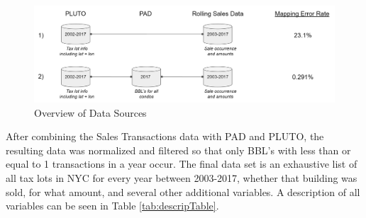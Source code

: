 \documentclass[12pt,]{article}
\begin{document}
\begin{figure}[H]
\includegraphics[width=1\linewidth]{Sections/tables and figures/Data Schema} \caption{Overview of Data Sources}\label{fig:Data Schema}
\end{figure}

After combining the Sales Transactions data with PAD and PLUTO, the
resulting data was normalized and filtered so that only BBL's with less
than or equal to 1 transactions in a year occur. The final data set is
an exhaustive list of all tax lots in NYC for every year between
2003-2017, whether that building was sold, for what amount, and several
other additional variables. A description of all variables can be seen
in Table \ref{tab:descripTable}.
\end{document}
